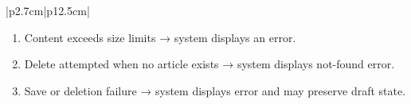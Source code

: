 \begin{table}[H]
\begin{tabular}{|p{2.7cm}|p{12.5cm}|}
\begin{minipage}[t]{\linewidth}
\begin{enumerate}[topsep=0pt,itemsep=1pt,parsep=0pt,partopsep=0pt]
                \item Content exceeds size limits → system displays an error.
                \item Delete attempted when no article exists → system displays not-found error.
                \item Save or deletion failure → system displays error and may preserve draft state.
            \end{enumerate}
        \end{minipage} \\
        \hline
    \end{tabular}
    \label{tab:teacher-manage-article}
\end{table}
 
